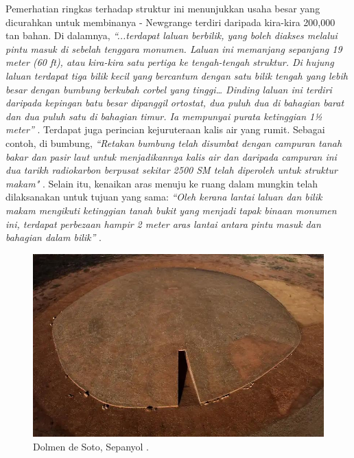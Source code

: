 \documentclass[10pt,twocolumn,letterpaper]{article}
\begin{document}
Pemerhatian ringkas terhadap struktur ini menunjukkan usaha besar yang dicurahkan untuk membinanya - Newgrange terdiri daripada kira-kira 200,000 tan bahan. Di dalamnya, \textit{“...terdapat laluan berbilik, yang boleh diakses melalui pintu masuk di sebelah tenggara monumen. Laluan ini memanjang sepanjang 19 meter (60 ft), atau kira-kira satu pertiga ke tengah-tengah struktur. Di hujung laluan terdapat tiga bilik kecil yang bercantum dengan satu bilik tengah yang lebih besar dengan bumbung berkubah corbel yang tinggi… Dinding laluan ini terdiri daripada kepingan batu besar dipanggil ortostat, dua puluh dua di bahagian barat dan dua puluh satu di bahagian timur. Ia mempunyai purata ketinggian 1½ meter”} \cite{70}. Terdapat juga perincian kejuruteraan kalis air yang rumit. Sebagai contoh, di bumbung, \textit{“Retakan bumbung telah disumbat dengan campuran tanah bakar dan pasir laut untuk menjadikannya kalis air dan daripada campuran ini dua tarikh radiokarbon berpusat sekitar 2500 SM telah diperoleh untuk struktur makam"} \cite{71}. Selain itu, kenaikan aras menuju ke ruang dalam mungkin telah dilaksanakan untuk tujuan yang sama: \textit{“Oleh kerana lantai laluan dan bilik makam mengikuti ketinggian tanah bukit yang menjadi tapak binaan monumen ini, terdapat perbezaan hampir 2 meter aras lantai antara pintu masuk dan bahagian dalam bilik”} \cite{71}.

\begin{figure}[b]

\begin{center}
   \includegraphics[width=1\linewidth]{dolmen.jpg}
\end{center}
   \caption{Dolmen de Soto, Sepanyol \cite{53}.}
\label{fig:9}
\label{fig:onecol}
\end{figure}
\end{document}
